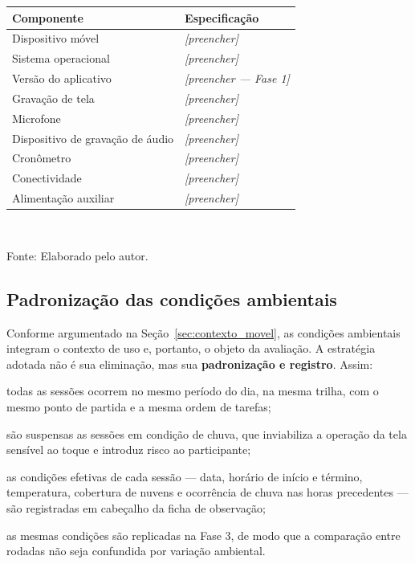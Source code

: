 \begin{quadro}[htb]
\centering
\caption{Aparato técnico utilizado nas sessões}
\label{quad:aparato}
\begin{tabular}{p{4.2cm} p{8.6cm}}
\toprule
\textbf{Componente} & \textbf{Especificação} \\
\midrule
Dispositivo móvel & \textit{[preencher]} \\
Sistema operacional & \textit{[preencher]} \\
Versão do aplicativo & \textit{[preencher --- Fase 1]} \\
Gravação de tela & \textit{[preencher]} \\
Microfone & \textit{[preencher]} \\
Dispositivo de gravação de áudio & \textit{[preencher]} \\
Cronômetro & \textit{[preencher]} \\
Conectividade & \textit{[preencher]} \\
Alimentação auxiliar & \textit{[preencher]} \\
\bottomrule
\end{tabular}
\\[4pt]
\begin{flushleft}
Fonte: Elaborado pelo autor.
\end{flushleft}
\end{quadro}

\subsection{Padronização das condições ambientais}

Conforme argumentado na Seção~\ref{sec:contexto_movel}, as condições ambientais
integram o contexto de uso e, portanto, o objeto da avaliação. A estratégia
adotada não é sua eliminação, mas sua \textbf{padronização e registro}. Assim:

\begin{alineas}
  \item todas as sessões ocorrem no mesmo período do dia, na mesma trilha, com o
  mesmo ponto de partida e a mesma ordem de tarefas;

  \item são suspensas as sessões em condição de chuva, que inviabiliza a operação
  da tela sensível ao toque e introduz risco ao participante;

  \item as condições efetivas de cada sessão --- data, horário de início e
  término, temperatura, cobertura de nuvens e ocorrência de chuva nas horas
  precedentes --- são registradas em cabeçalho da ficha de observação;

  \item as mesmas condições são replicadas na Fase 3, de modo que a comparação
  entre rodadas não seja confundida por variação ambiental.
\end{alineas}


